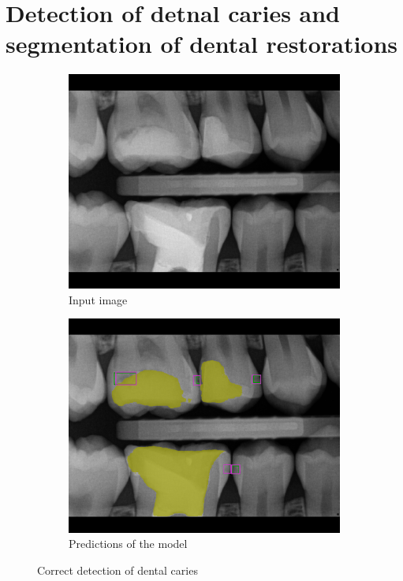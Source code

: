 \section{Detection of detnal caries and segmentation of dental restorations}
\label{chpater:appendix:preds}
\begin{figure}[h]
    \centering
    \begin{subfigure}[b]{0.9\textwidth}
        \includegraphics[width=1\linewidth]{images/det1orig.png}
        \caption{Input image}
    \end{subfigure}

    \begin{subfigure}[b]{0.9\textwidth}
        \includegraphics[width=1\linewidth]{images/det1pred.png}
        \caption{Predictions of the model}
    \end{subfigure}
    \caption{Correct detection of dental caries}
\end{figure}


